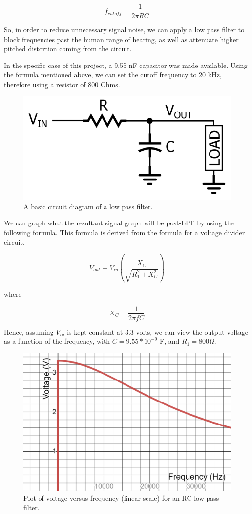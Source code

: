 \documentclass[10pt]{article}
\begin{document}
$$
f_{cutoff}=\frac{1}{2 \pi R C}
$$

So, in order to reduce unnecessary signal noise, we can apply a low pass filter to block frequencies past the human range of hearing, as well as attenuate higher pitched distortion coming from the circuit. 

In the specific case of this project, a 9.55 nF capacitor was made available. Using the formula mentioned above, we can set the cutoff frequency to 20 kHz, therefore using a resistor of 800 Ohms. 

\begin{figure}[H]
    \centering
    \includegraphics[width = 0.4 \textwidth]{lowpassfilter.png}
    \caption{A basic circuit diagram of a low pass filter. } %
    \label{fig:LPF}
\end{figure}

We can graph what the resultant signal graph will be post-LPF by using the following formula. This formula is derived from the formula for a voltage divider circuit. 



$$
V_{out}=V_{in}\left(\frac{X_{C}}{\sqrt{R_{1}^{2}+X_{C}^{2}}}\right)
$$

where

$$
X_{C}=\frac{1}{2 \pi f C}
$$

Hence, assuming $V_{in}$ is kept constant at 3.3 volts, we can view the output voltage as a function of the frequency, with $C = 9.55*10^{-9}$ F, and $R_1 = 800 \Omega$. 

\begin{figure}[H]
    \centering
    \includegraphics[width = 0.5 \textwidth]{lpfgraph.png}
    \caption{Plot of voltage versus frequency (linear scale) for an RC low pass filter. }
    \label{fig:lpfgraph}
\end{figure}
\end{document}
